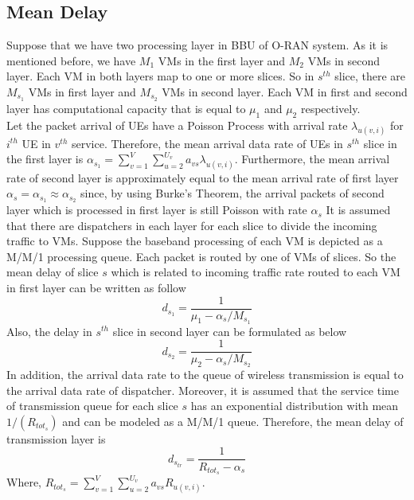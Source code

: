 \documentclass[conference]{IEEEtran}
\begin{document}
\subsection{Mean Delay}
Suppose that we have two processing layer in BBU of O-RAN system. As it is mentioned before, we have $M_1$ VMs in the first layer and $M_2$ VMs in second layer. Each VM in both layers map to one or more slices. So in $s^{th}$ slice, there are $M_{s_1}$ VMs in first layer and $M_{s_2}$ VMs in second layer. Each VM in first and second layer has computational capacity that is  equal to $\mu_1$ and $\mu_2$ respectively. \\
Let the packet arrival of UEs have a Poisson Process with arrival rate $\lambda_{u(v,i)}$ for $i^{th}$ UE in $v^{th}$ service. 
Therefore, the mean arrival data rate of UEs in $s^{th}$ slice in the first layer is 
$\alpha_{s_1} = \sum_{v=1}^{V}\sum_{u=2}^{U_v}a_{vs}\lambda_{u(v,i)}$.  
Furthermore, the mean arrival rate of second layer is approximately equal to the mean arrival rate of first layer $\alpha_{s} =\alpha_{s_1} \approx \alpha_{s_2}$ since, by using Burke’s Theorem, the arrival packets of second layer which is processed in first layer is still Poisson with rate $\alpha_{s}$  
It is assumed that there are dispatchers in each layer for each slice to divide the incoming traffic to VMs.
Suppose the baseband processing of each VM is depicted as a M/M/1 processing queue.
Each packet is routed by one of VMs of slices. So the mean delay of slice $s$ which is related to incoming traffic rate routed to
each VM in first layer can be written as follow
\begin{equation}
d_{s_1} = \frac{1}{\mu_1 - \alpha_{s}/{M_{s_1}}}
\end{equation}
Also, the delay in $s^{th}$ slice in second layer can be formulated as below
\begin{equation}
d_{s_2} = \frac{1}{\mu_2 - \alpha_{s}/{M_{s_2}}}
\end{equation}
In addition, the arrival data rate to the queue of wireless transmission
 is equal to the arrival data rate of dispatcher.
Moreover, it is assumed that the service time of transmission queue for each slice $s$ has 
 an exponential distribution with mean $1/(R_{{tot}_s})$ and can be modeled as a M/M/1 queue. Therefore, 
the mean delay of transmission layer is 
\begin{equation}
d_{s_{tr}} = \frac{1}{R_{{tot}_s} - \alpha_{s}}
\end{equation}
Where, $R_{{tot}_s} =  \sum_{v=1}^{V}\sum_{u=2}^{U_v}a_{vs}R_{u(v,i)}$.
\end{document}
